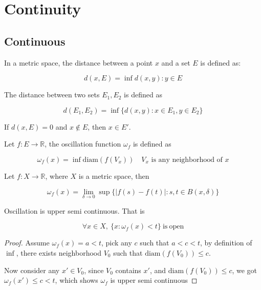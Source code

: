 \section{Continuity}

\subsection{Continuous}

\begin{definition}[Distance]
   In a metric space, the distance between a point $x$ and a set $E$ is defined as:
   
   \[
    d(x, E) = \inf {d(x,y): y \in E}
   \]

   The distance between two sets $E_1, E_2$ is defined as

   \[
    d(E_1, E_2) = \inf \{ d(x,y): x \in E_1, y \in E_2\}
   \]
\end{definition}

\begin{corollary}
    If $d(x, E) = 0$ and $x \notin E$, then $x \in E'$.
\end{corollary}


\begin{definition}[Oscillation]
    Let $f: E \to \mathbb{R}$, the oscillation function $\omega_f$ is defined as

    \[
        \omega_f(x) = \inf \mathrm{diam}(f(V_x)) \quad V_x \text{ is any neighborhood of } x
    \]
\end{definition}

\begin{corollary}
    Let $f: X \to \mathbb{R}$, where $X$ is a metric space, then


    \[
        \omega_f(x) = \lim_{\delta \to 0} \sup \{ \left| f(s) - f(t) \right|: s,t \in B(x, \delta) \}
    \]
\end{corollary}

\begin{thm}
    Oscillation is upper semi continuous. That is

    \[
        \forall x \in X,\: \{x: \omega_f (x) < t \} \mathrm{\ is\ open}
    \]
\end{thm}

\begin{proof}
    Assume $\omega_f(x) = a < t$, pick any $c$ such that $a < c < t$, by definition of $\inf$, 
    there exists neighborhood $V_0$ such that $\mathrm{diam}(f(V_0)) \le c$.

    Now consider any $x' \in V_0$, since $V_0$ contains $x'$, and $\mathrm{diam}(f(V_0)) \le c$,
    we got $\omega_f(x') \le c < t$, which shows $\omega_f$ is upper semi continuous
\end{proof}